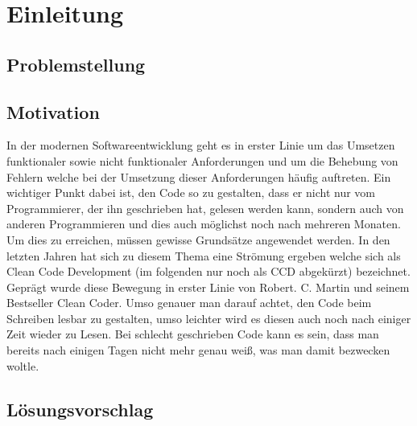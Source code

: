 \chapter{Einleitung}
\label{cha:Einleitung}

\section{Problemstellung}


\section{Motivation}
In der modernen Softwareentwicklung geht es in erster Linie um das Umsetzen funktionaler sowie nicht funktionaler
Anforderungen und um die Behebung von Fehlern welche bei der Umsetzung dieser Anforderungen häufig auftreten. Ein wichtiger Punkt dabei ist, den Code so zu gestalten, dass er nicht nur vom Programmierer, der ihn geschrieben hat, gelesen werden kann, sondern auch von anderen Programmieren und dies auch möglichst noch nach mehreren Monaten. Um dies zu erreichen, müssen gewisse Grundsätze angewendet werden. In den letzten Jahren hat sich zu diesem Thema eine Strömung ergeben welche sich als Clean Code Development (im folgenden nur noch als CCD abgekürzt) bezeichnet. Geprägt wurde diese Bewegung in erster Linie von Robert. C. Martin und seinem Bestseller Clean Coder. Umso genauer man darauf achtet, den Code beim Schreiben lesbar zu gestalten, umso leichter wird es diesen auch noch nach einiger Zeit wieder zu Lesen. Bei schlecht geschrieben Code kann es sein, dass man bereits nach einigen Tagen nicht mehr genau weiß, was man damit bezwecken woltle. 

\section{Lösungsvorschlag}